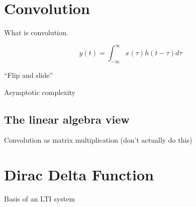 \section{Convolution}
What is convolution. 

\[
y(t) = \int_{-\infty}^{\infty} x(\tau) h(t - \tau) d\tau
\]

``Flip and slide'' 

Asymptotic complexity 

\subsection{The linear algebra view}
Convolution as matrix multiplication (don't actually do this)


\section{Dirac Delta Function}

Basis of an LTI system


